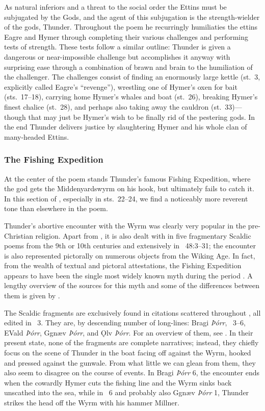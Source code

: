 As natural inferiors and a threat to the social order the Ettins must be subjugated by the Gods, and the agent of this subjugation is the strength-wielder of the gods, Thunder.  Throughout the poem he recurringly humiliaties the ettins Eagre and Hymer through completing their various challenges and performing tests of strength.  These tests follow a similar outline: Thunder is given a dangerous or near-impossible challenge but accomplishes it anyway with surprising ease through a combination of brawn and brain to the humiliation of the challenger.  The challenges consist of finding an enormously large kettle (st.~3, explicitly called Eagre’s “revenge”), wrestling one of Hymer’s oxen for bait (sts.~17--18), carrying home Hymer’s whales and boat (st.~26), breaking Hymer’s finest chalice (st.~28), and perhaps also taking away the cauldron (st.~33)---though that may just be Hymer’s wish to be finally rid of the pestering gods.  In the end Thunder delivers justice by slaughtering Hymer and his whole clan of many-headed Ettins.

\subsubsection{The Fishing Expedition}

At the center of the poem stands Thunder’s famous Fishing Expedition, where the god gets the Middenyardswyrm on his hook, but ultimately fails to catch it.  In this section of \Hymiskvida, especially in sts.~22--24, we find a noticeably more reverent tone than elsewhere in the poem.

Thunder’s abortive encounter with the Wyrm was clearly very popular in the pre-Christian religion.  Apart from \Hymiskvida, it is also dealt with in five fragmentary Scaldic poems from the 9th or 10th centuries and extensively in \Gylfaginning~48:3--31; the encounter is also represented pictorally on numerous objects from the Wiking Age.  In fact, from the wealth of textual and pictoral attestations, the Fishing Expedition appears to have been the single most widely known myth during the period \parencite[1055]{Lindow2020Thorr}.  A lengthy overview of the sources for this myth and some of the differences between them is given by \textcite[1055--1071]{Lindow2020Thorr}.

The Scaldic fragments are exclusively found in citations scattered throughout \Skaldskaparmal, all edited in \Skp\ 3.  They are, by descending number of long-lines: Bragi \emph{Þórr}, \Husdrapa\ 3--6, EVald \emph{Þórr}, Ggnæv \emph{Þórr}, and Ǫlv \emph{Þórr}.  For an overview of them, see \textcite[1055--1061]{Lindow2020Thorr}.
In their present state, none of the fragments are complete narratives; instead, they chiefly focus on the scene of Thunder in the boat facing off against the Wyrm, hooked and pressed against the gunwale.
From what little we can glean from them, they also seem to disagree on the course of events.  In Bragi \emph{Þórr} 6, the encounter ends when the cowardly Hymer cuts the fishing line and the Wyrm sinks back unscathed into the sea, while in \Husdrapa\ 6 and probably also Ggnæv \emph{Þórr} 1, Thunder strikes the head off the Wyrm with his hammer Millner.

